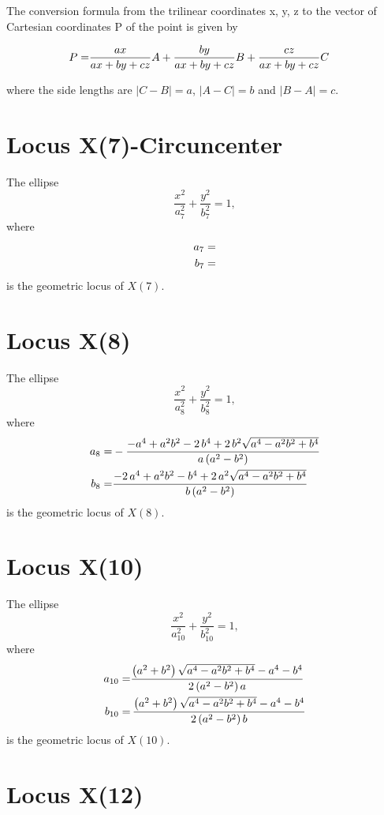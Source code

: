 \documentclass[11pt]{amsart}
\theoremstyle{plain}
\theoremstyle{definition}
\begin{document}
    
  The conversion formula from the trilinear coordinates x, y, z to the vector of Cartesian coordinates P of the point is given by
  
   
  \[ \aligned   
  P=&{\frac {ax}{ax+by+cz}}{  A}+{\frac {by}{ax+by+cz}}{  {B}}+{\frac {cz}{ax+by+cz}}{ C} 
\endaligned\]
   
   where the side lengths are $|C - B| = a$, $|A - C| = b$ and $|B - A| = c. $
    \section{Locus X(7)-Circuncenter}
    
    
   
   The ellipse \[ \frac{x^2}{a_{7}^2}+\frac{y^2}{b_{7}^2}=1, \]
   where
   \[\aligned 
   a_7=&    
   \\
   b_7=&  
   \endaligned\] 
   is the geometric locus of $X(7)$.
   
   
         \section{Locus X(8)}
   
   The ellipse \[ \frac{x^2}{a_{8}^2}+\frac{y^2}{b_{8}^2}=1, \]
   where
   \[\aligned 
   a_{8}=&   -{\frac {-{a}^{4}+{a}^{2}{b}^{2}-2\,{b}^{4}+2\,b^2\sqrt {{a}^{4}-{a}^{2}{
   				b}^{2}+{b}^{4}} }{a \left( a^2-b^2\right)   }}
   \\
   b_{8}=&  {\frac {-2\,{a}^{4}+{a}^{2}{b}^{2}-{b}^{4}+2\,{a}^{2} \sqrt {{a}^{4}-{a}^{2}{b
   			}^{2}+{b}^{4}}}{b \left( {a}^{2}-{b}^{2} \right) }}
   \endaligned\] 
   is the geometric locus of $X(8)$.
   
   
      \section{Locus X(10)}
      
       The ellipse \[ \frac{x^2}{a_{10}^2}+\frac{y^2}{b_{10}^2}=1, \]
      where
      \[\aligned 
      a_{10}=&    {\frac { \left( {a}^{2}+{b}^{2} \right) \sqrt {{a}^{4}-{a}^{2}{b}
      			^{2}+{b}^{4}}-{a}^{4}-{b}^{4}}{ 2\left( {a}^{2}-{b}^{2} \right) a}}
\\
b_{10}=& \,{\frac { \left( {a}^{2}+{b}^{2} \right) \sqrt {{a}^{4}-{a}^{2}{b}
			^{2}+{b}^{4}}-{a}^{4}-{b}^{4}}{ 2\left( {a}^{2}-{b}^{2} \right) b}}
%
\endaligned\] 
is the geometric locus of $X(10)$.



\section{Locus X(12)}
\end{document}
